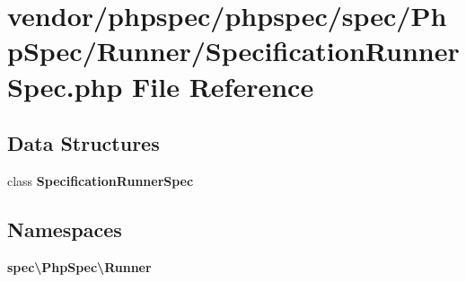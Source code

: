 \section{vendor/phpspec/phpspec/spec/\+Php\+Spec/\+Runner/\+Specification\+Runner\+Spec.php File Reference}
\label{_specification_runner_spec_8php}
\subsection*{Data Structures}
\begin{DoxyCompactItemize}
\item 
class {\bf Specification\+Runner\+Spec}
\end{DoxyCompactItemize}
\subsection*{Namespaces}
\begin{DoxyCompactItemize}
\item 
 {\bf spec\textbackslash{}\+Php\+Spec\textbackslash{}\+Runner}
\end{DoxyCompactItemize}
